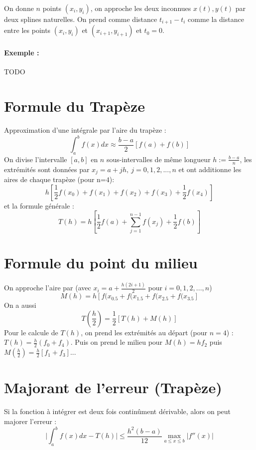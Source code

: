 \documentclass[a4paper,9pt]{extarticle}
\begin{document}
\begin{multicols*}{2}
On donne $n$ points $(x_i,y_i)$, on approche les deux inconnues $x(t),y(t)$ par deux splines naturelles. On prend comme distance $t_{i+1}-t_i$ comme la distance entre les points $(x_i,y_i)$ et $(x_{i+1},y_{i+1})$ et $t_0=0$.

\paragraph*{Exemple :}

TODO

\section{Formule du Trapèze}
Approximation d'une intégrale par l'aire du trapèze :
$$
\int_a^bf(x)dx\approx\frac{b-a}{2}[f(a)+f(b)]
$$
On divise l'intervalle $[a,b]$ en $n$ sous-intervalles de même longueur $h := \frac{b-a}{n}$, les extrémités sont données par $x_j=a+jh,\ j=0,1,2,...,n$ et ont additionne les aires de chaque trapèze (pour n=$4$):
$$
h[\frac{1}{2}f(x_0)+f(x_1)+f(x_2)+f(x_3)+\frac{1}{2}f(x_4)]
$$
et la formule générale :
$$
T(h)=h[\frac{1}{2}f(a)+\sum_{j=1}^{n-1}f(x_j)+\frac{1}{2}f(b)]
$$

\section{Formule du point du milieu}

On approche l'aire par (avec $x_i=a+\frac{h(2i+1)}{2}$ pour $i=0,1,2,...,n$)
$$
M(h)=h[f(x_{0.5}+f(x_{1.5}+f(x_{2.5}+f(x_{3.5}]
$$
On a aussi
$$
T(\frac{h}{2})=\frac{1}{2}[T(h)+M(h)]
$$
Pour le calcule de $T(h)$, on prend les extrémités au départ (pour $n=4$) : $T(h)=\frac{h}{2}(f_0+f_4)$. Puis on prend le milieu pour $M(h)=hf_2$ puis $M(\frac{h}{2})=\frac{h}{2}[f_1+f_3]$...

\section{Majorant de l'erreur (Trapèze)}
Si la fonction à intégrer est deux fois continûment dérivable, alors on peut majorer l'erreur :
$$
\Big|\int_a^bf(x)dx-T(h)\Big|\leq \frac{h^2(b-a)}{12} \max_{a\leq x \leq b}|f''(x)|
$$


\end{multicols*}
\end{document}
